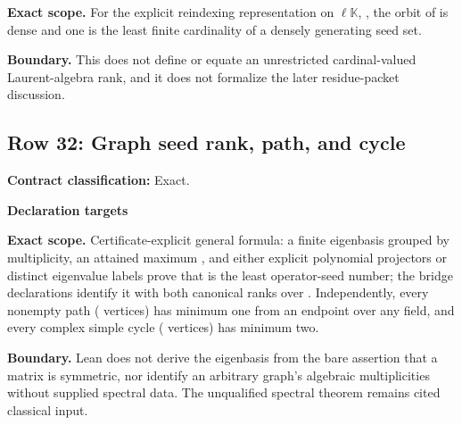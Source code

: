 {\small\noindent{}\par}
\medskip\noindent\textbf{Exact scope.} For the explicit reindexing representation on \code{}\ensuremath{\ell}\ensuremath{\mathbb{K}}\code{)}, , the orbit of  is dense and one is the least finite cardinality of a densely generating seed set.
\par\smallskip\noindent\textbf{Boundary.} This does not define or equate an unrestricted cardinal-valued Laurent-algebra rank, and it does not formalize the later residue-packet discussion.
\medskip
{}\subsection{Row 32: Graph seed rank, path, and cycle}
\label{row:32}
\textbf{Contract classification:} Exact.
\par\smallskip\textbf{Declaration targets}\par
{\small\noindent{}\par}
{\small\noindent{}\par}
{\small\noindent{}\par}
{\small\noindent{}\par}
{\small\noindent{}\par}
{\small\noindent{}\par}
\medskip\noindent\textbf{Exact scope.} Certificate-explicit general formula: a finite eigenbasis grouped by multiplicity, an attained maximum , and either explicit polynomial projectors or distinct eigenvalue labels prove that  is the least operator-seed number; the bridge declarations identify it with both canonical ranks over . Independently, every nonempty path ( vertices) has minimum one from an endpoint over any field, and every complex simple cycle ( vertices) has minimum two.
\par\smallskip\noindent\textbf{Boundary.} Lean does not derive the eigenbasis from the bare assertion that a matrix is symmetric, nor identify an arbitrary graph's algebraic multiplicities without supplied spectral data. The unqualified spectral theorem remains cited classical input.
